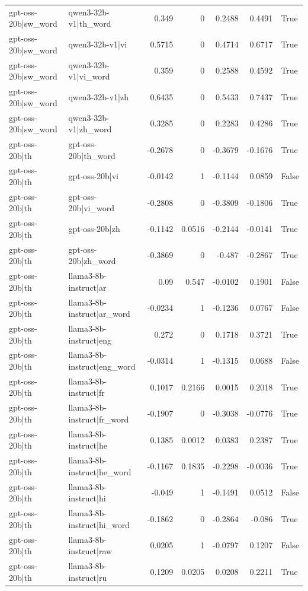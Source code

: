 \begin{table}
\begin{tabular}{l l r r r r l}
gpt-oss-20b|sw_word & qwen3-32b-v1|th_word & 0.349 & 0 & 0.2488 & 0.4491 & True \\
gpt-oss-20b|sw_word & qwen3-32b-v1|vi & 0.5715 & 0 & 0.4714 & 0.6717 & True \\
gpt-oss-20b|sw_word & qwen3-32b-v1|vi_word & 0.359 & 0 & 0.2588 & 0.4592 & True \\
gpt-oss-20b|sw_word & qwen3-32b-v1|zh & 0.6435 & 0 & 0.5433 & 0.7437 & True \\
gpt-oss-20b|sw_word & qwen3-32b-v1|zh_word & 0.3285 & 0 & 0.2283 & 0.4286 & True \\
gpt-oss-20b|th & gpt-oss-20b|th_word & -0.2678 & 0 & -0.3679 & -0.1676 & True \\
gpt-oss-20b|th & gpt-oss-20b|vi & -0.0142 & 1 & -0.1144 & 0.0859 & False \\
gpt-oss-20b|th & gpt-oss-20b|vi_word & -0.2808 & 0 & -0.3809 & -0.1806 & True \\
gpt-oss-20b|th & gpt-oss-20b|zh & -0.1142 & 0.0516 & -0.2144 & -0.0141 & True \\
gpt-oss-20b|th & gpt-oss-20b|zh_word & -0.3869 & 0 & -0.487 & -0.2867 & True \\
gpt-oss-20b|th & llama3-8b-instruct|ar & 0.09 & 0.547 & -0.0102 & 0.1901 & False \\
gpt-oss-20b|th & llama3-8b-instruct|ar_word & -0.0234 & 1 & -0.1236 & 0.0767 & False \\
gpt-oss-20b|th & llama3-8b-instruct|eng & 0.272 & 0 & 0.1718 & 0.3721 & True \\
gpt-oss-20b|th & llama3-8b-instruct|eng_word & -0.0314 & 1 & -0.1315 & 0.0688 & False \\
gpt-oss-20b|th & llama3-8b-instruct|fr & 0.1017 & 0.2166 & 0.0015 & 0.2018 & True \\
gpt-oss-20b|th & llama3-8b-instruct|fr_word & -0.1907 & 0 & -0.3038 & -0.0776 & True \\
gpt-oss-20b|th & llama3-8b-instruct|he & 0.1385 & 0.0012 & 0.0383 & 0.2387 & True \\
gpt-oss-20b|th & llama3-8b-instruct|he_word & -0.1167 & 0.1835 & -0.2298 & -0.0036 & True \\
gpt-oss-20b|th & llama3-8b-instruct|hi & -0.049 & 1 & -0.1491 & 0.0512 & False \\
gpt-oss-20b|th & llama3-8b-instruct|hi_word & -0.1862 & 0 & -0.2864 & -0.086 & True \\
gpt-oss-20b|th & llama3-8b-instruct|raw & 0.0205 & 1 & -0.0797 & 0.1207 & False \\
gpt-oss-20b|th & llama3-8b-instruct|ru & 0.1209 & 0.0205 & 0.0208 & 0.2211 & True \\

\end{tabular}
\end{table}
